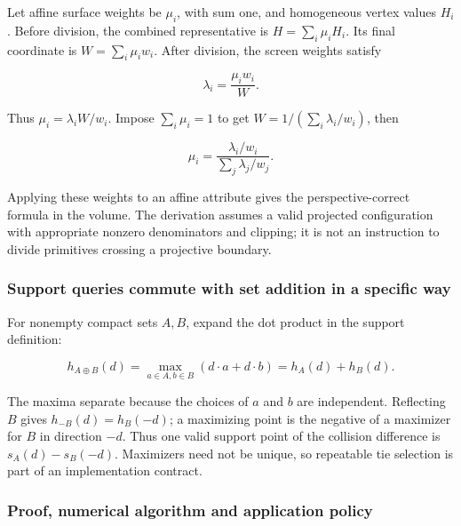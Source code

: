 \hypertarget{02-foundations-ii-ch039-why-perspective-interpolation-uses-reciprocal-weights}{}

Let affine surface weights be \(\mu_i\), with sum one, and homogeneous vertex values \(H_i\). Before division, the combined representative is \(H=\sum_i\mu_iH_i\). Its final coordinate is \(W=\sum_i\mu_iw_i\). After division, the screen weights satisfy

\[
\lambda_i=\frac{\mu_iw_i}{W}.
\]

Thus \(\mu_i=\lambda_iW/w_i\). Impose \(\sum_i\mu_i=1\) to get \(W=1/(\sum_i\lambda_i/w_i)\), then

\[
\mu_i=\frac{\lambda_i/w_i}{\sum_j\lambda_j/w_j}.
\]

Applying these weights to an affine attribute gives the perspective-correct formula in the volume. The derivation assumes a valid projected configuration with appropriate nonzero denominators and clipping; it is not an instruction to divide primitives crossing a projective boundary.

\subsubsection{Support queries commute with set addition in a specific way}\label{02-foundations-ii-ch039-support-queries-commute-with-set-addition-in-a-specific-way}

\hypertarget{02-foundations-ii-ch039-support-queries-commute-with-set-addition-in-a-specific-way}{}

For nonempty compact sets \(A,B\), expand the dot product in the support definition:

\[
h_{A\oplus B}(d)=\max_{a\in A,b\in B}(d\cdot a+d\cdot b)
=h_A(d)+h_B(d).
\]

The maxima separate because the choices of \(a\) and \(b\) are independent. Reflecting \(B\) gives \(h_{-B}(d)=h_B(-d)\); a maximizing point is the negative of a maximizer for \(B\) in direction \(-d\). Thus one valid support point of the collision difference is \(s_A(d)-s_B(-d)\). Maximizers need not be unique, so repeatable tie selection is part of an implementation contract.

\subsubsection{Proof, numerical algorithm and application policy}\label{02-foundations-ii-ch039-proof-numerical-algorithm-and-application-policy}

\hypertarget{02-foundations-ii-ch039-proof-numerical-algorithm-and-application-policy}{}

